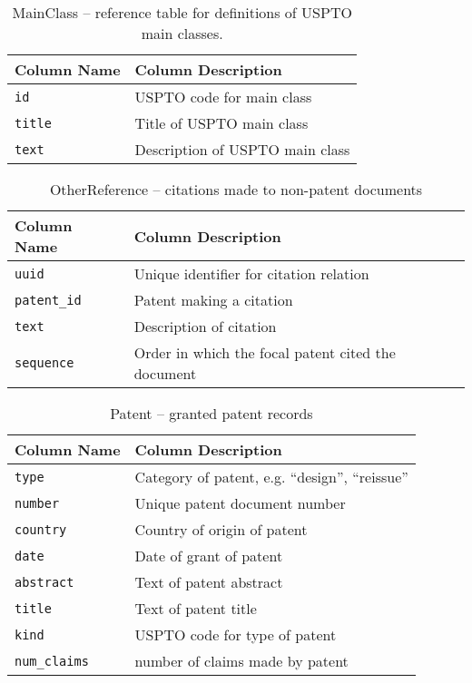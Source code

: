 \begin{table}[ht]
\center
\begin{tabular}{| l | l |}
\hline
Column Name & Column Description \\
\hline
\verb`id` & USPTO code for main class \\
\verb`title` & Title of USPTO main class \\
\verb`text` & Description of USPTO main class \\
\hline
\end{tabular}
\caption{MainClass -- reference table for definitions of USPTO main classes.}
\end{table}

\begin{table}[ht]
\center
\begin{tabular}{| l | l |}
\hline
Column Name & Column Description \\
\hline
\verb`uuid` & Unique identifier for citation relation \\
\verb`patent_id` & Patent making a citation \\
\verb`text` & Description of citation \\
\verb`sequence` & Order in which the focal patent cited the document \\
\hline
\end{tabular}
\caption{OtherReference -- citations made to non-patent documents}
\end{table}

\begin{table}[ht]
\center
\begin{tabular}{| l | l |}
\hline
Column Name & Column Description \\
\hline
\verb`type` & Category of patent, e.g. ``design'', ``reissue'' \\
\verb`number` & Unique patent document number \\
\verb`country` & Country of origin of patent \\
\verb`date` & Date of grant of patent \\
\verb`abstract` & Text of patent abstract \\
\verb`title` & Text of patent title \\
\verb`kind` & USPTO code for type of patent \\
\verb`num_claims` & number of claims made by patent \\
\hline
\end{tabular}
\caption{Patent -- granted patent records}
\end{table}

